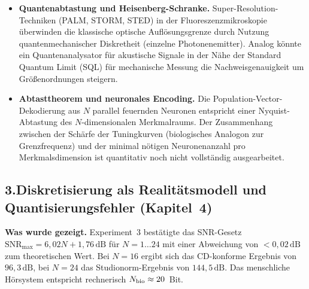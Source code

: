 ﻿\documentclass[12pt,a4paper,titlepage]{report}
\begin{document}
\begin{itemize}[leftmargin=2em]
    für Wellenlängen $\lambda < 2d$.
    Das Nyquist-Kriterium überträgt sich nach
    $f_{s,\mathrm{spatial}} = 1/(2d) \geq k_{\max}/\pi$
    direkt auf den Wellenzahlraum.
    Die Verbindung zur Katzenpinna (verteilte räumliche Apertur) und zur
    Kochlea (verteilte spektrale Auflösung) ist eine theoretisch
    fruchtbare Forschungsrichtung.
  \item \textbf{Quantenabtastung und Heisenberg-Schranke.}
    Super-Resolution-Techniken (PALM, STORM, STED) in der Fluoreszenzmikroskopie
    überwinden die klassische optische Auflösungsgrenze durch Nutzung
    quantenmechanischer Diskretheit (einzelne Photonenemitter).
    Analog könnte ein Quantenanalysator für akustische Signale in der
    Nähe der Standard Quantum Limit (SQL) für mechanische Messung die
    Nachweisgenauigkeit um Größenordnungen steigern.
  \item \textbf{Abtasttheorem und neuronales Encoding.}
    Die Population-Vector-Dekodierung aus $N$ parallel feuernden
    Neuronen entspricht einer Nyquist-Abtastung des
    $N$-dimensionalen Merkmalraums.
    Der Zusammenhang zwischen der Schärfe der Tuningkurven
    (biologisches Analogon zur Grenzfrequenz) und der minimal
    nötigen Neuronenanzahl pro Merkmalsdimension ist quantitativ
    noch nicht vollständig ausgearbeitet.
\end{itemize}

\subsection*{3.\enspace Diskretisierung als Realitätsmodell und
Quantisierungsfehler (Kapitel~4)}

\textbf{Was wurde gezeigt.}
Experiment~3 bestätigte das SNR-Gesetz
$\mathrm{SNR}_{\max} = 6{,}02N + 1{,}76\,\mathrm{dB}$
für $N=1\ldots 24$ mit einer Abweichung von $< 0{,}02\,\mathrm{dB}$
zum theoretischen Wert.
Bei $N=16$ ergibt sich das CD-konforme Ergebnis von $96{,}3\,\mathrm{dB}$,
bei $N=24$ das Studionorm-Ergebnis von $144{,}5\,\mathrm{dB}$.
Das menschliche Hörsystem entspricht rechnerisch $N_{\rm bio}\approx 20$~Bit.
\end{document}
